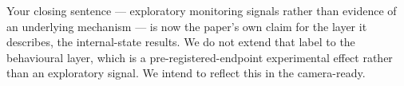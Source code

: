 \noindent
Your closing sentence --- exploratory monitoring signals rather than evidence of an underlying
mechanism --- is now the paper's own claim for the layer it describes, the internal-state
results. We do not extend that label to the behavioural layer, which is a
pre-registered-endpoint experimental effect rather than an exploratory signal. We intend to
reflect this in the camera-ready.

